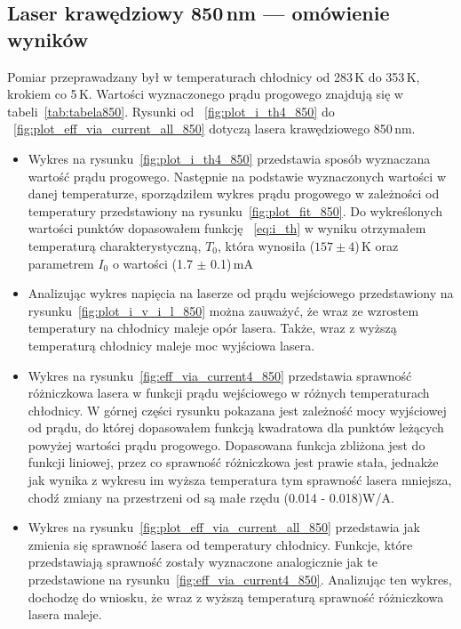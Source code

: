 \subsection{Laser krawędziowy 850\,nm --- omówienie wyników}
Pomiar przeprawadzany był w temperaturach chłodnicy od 283\,K do 353\,K, krokiem co 5\,K. Wartości wyznaczonego prądu progowego
znajdują się w tabeli~\ref{tab:tabela850}. Rysunki od ~\ref{fig:plot_i_th4_850} do ~\ref{fig:plot_eff_via_current_all_850} dotyczą lasera
krawędziowego 850\,nm.
\begin{itemize}
\item Wykres na rysunku~\ref{fig:plot_i_th4_850} przedstawia sposób wyznaczana wartość prądu progowego. Następnie na podstawie
wyznaczonych wartości w danej temperaturze, sporządziłem wykres prądu progowego w zależności od temperatury
przedstawiony na rysunku~\ref{fig:plot_fit_850}. Do wykreślonych wartości punktów dopasowałem funkcję ~\ref{eq:i_th} w wyniku otrzymałem
 temperaturą charakterystyczną, $T_0$, która wynosiła ($157 \pm 4$)\,K oraz parametrem $I_0$ o wartości (1.7 $\pm$ 0.1)\,mA
\item Analizując wykres napięcia na laserze od prądu wejściowego przedstawiony na rysunku~\ref{fig:plot_i_v_i_l_850}
można zauważyć, że wraz ze wzrostem temperatury na chłodnicy
maleje opór lasera. Także, wraz z wyższą temperaturą chłodnicy maleje moc wyjściowa lasera.
\item Wykres na rysunku~\ref{fig:eff_via_current4_850} przedstawia sprawność różniczkowa lasera w funkcji prądu wejściowego
w różnych temperaturach chłodnicy. W górnej części rysunku pokazana jest zależność mocy wyjściowej od prądu, do której dopasowałem
funkcją kwadratowa dla punktów leżących powyżej wartości prądu progowego. Dopasowana funkcja zbliżona jest do funkcji liniowej, przez co sprawność różniczkowa jest
prawie stała, jednakże jak wynika z wykresu im wyższa temperatura tym sprawność lasera mniejsza, chodź zmiany na
przestrzeni od są małe rzędu (0.014 - 0.018)W/A.
\item Wykres na rysunku~\ref{fig:plot_eff_via_current_all_850} przedstawia jak zmienia się sprawność lasera od temperatury chłodnicy.
Funkcje, które przedstawiają sprawność zostały wyznaczone analogicznie jak te przedstawione na rysunku~\ref{fig:eff_via_current4_850}.
Analizując ten wykres, dochodzę do wniosku, że wraz z wyższą temperaturą sprawność różniczkowa lasera maleje.
\end{itemize}
